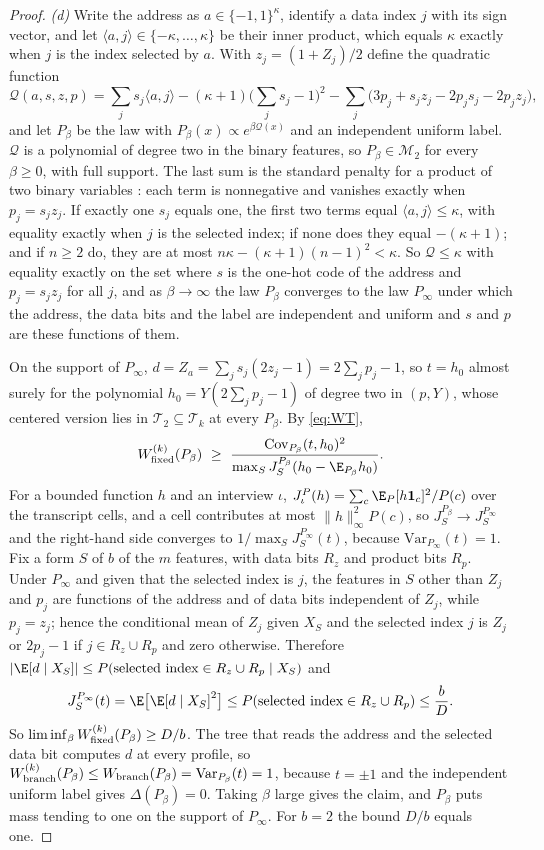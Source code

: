 \begin{proof}
\emph{(d)} Write the address as $a\in\{-1,1\}^\kappa$, identify a data index
$j$ with its sign vector, and let $\langle a,j\rangle\in\{-\kappa,\ldots,\kappa\}$
be their inner product, which equals $\kappa$ exactly when $j$ is the index
selected by $a$. With $z_j=(1+Z_j)/2$ define the quadratic function
\[
 \mathcal Q(a,s,z,p)=\sum_js_j\langle a,j\rangle-(\kappa+1)\Big(\sum_js_j-1\Big)^2
   -\sum_j\big(3p_j+s_jz_j-2p_js_j-2p_jz_j\big),
\]
and let $P_\beta$ be the law with $P_\beta(x)\propto e^{\beta\mathcal Q(x)}$ and an
independent uniform label. $\mathcal Q$ is a polynomial of degree two in the binary
features, so $P_\beta\in\mathcal M_2$ for every $\beta\ge0$, with full
support. The last sum is the standard penalty for a product of two binary
variables \citep{boros2002}: each term is nonnegative and vanishes exactly
when $p_j=s_jz_j$. If exactly one $s_j$ equals one, the first two terms equal
$\langle a,j\rangle\le\kappa$, with equality exactly when $j$ is the selected
index; if none does they equal $-(\kappa+1)$; and if $n\ge2$ do, they are at
most $n\kappa-(\kappa+1)(n-1)^2<\kappa$. So $\mathcal Q\le\kappa$ with equality
exactly on the set where $s$ is the one-hot code of the address and
$p_j=s_jz_j$ for all $j$, and as $\beta\to\infty$ the law $P_\beta$ converges
to the law $P_\infty$ under which the address, the data bits and the label
are independent and uniform and $s$ and $p$ are these functions of them.

On the support of $P_\infty$,
$d=Z_{a}=\sum_js_j(2z_j-1)=2\sum_jp_j-1$, so $t=h_0$ almost surely for the
polynomial $h_0=Y(2\sum_jp_j-1)$ of degree two in $(p,Y)$, whose centered
version lies in $\mathcal T_2\subseteq\mathcal T_k$ at every $P_\beta$. By
\eqref{eq:WT},
\[
 W^{(k)}_{\rm fixed}(P_\beta)\ \ge\ \frac{\mathrm{Cov}_{P_\beta}(t,h_0)^2}{\max_SJ^{P_\beta}_S(h_0-\E_{P_\beta}h_0)} .
\]
For a bounded function $h$ and an interview $\iota$,
$J^P_\iota(h)=\sum_c\E_P[h\mathbf 1_c]^2/P(c)$ over the transcript cells, and
a cell contributes at most $\|h\|_\infty^2P(c)$, so $J^{P_\beta}_S\to
J^{P_\infty}_S$ and the right-hand side converges to
$1/\max_SJ^{P_\infty}_S(t)$, because $\mathrm{Var}_{P_\infty}(t)=1$. Fix a
form $S$ of $b$ of the $m$ features, with data bits $R_z$ and product bits
$R_p$. Under $P_\infty$ and given that the selected index is $j$, the
features in $S$ other than $Z_j$ and $p_j$ are functions of the address and
of data bits independent of $Z_j$, while $p_j=z_j$; hence the conditional
mean of $Z_j$ given $X_S$ and the selected index $j$ is $Z_j$ or $2p_j-1$ if
$j\in R_z\cup R_p$ and zero otherwise. Therefore
$|\E[d\mid X_S]|\le P(\text{selected index}\in R_z\cup R_p\mid X_S)$ and
\[
 J^{P_\infty}_S(t)=\E\big[\E[d\mid X_S]^2\big]\le P(\text{selected index}\in R_z\cup R_p)\le\frac bD .
\]
So $\liminf_\beta W^{(k)}_{\rm fixed}(P_\beta)\ge D/b$. The tree that reads the
address and the selected data bit computes $d$ at every profile, so
$W^{(k)}_{\rm branch}(P_\beta)\le W_{\rm branch}(P_\beta)=\mathrm{Var}_{P_\beta}(t)=1$,
because $t=\pm1$ and the independent uniform label gives $\Delta(P_\beta)=0$.
Taking $\beta$ large gives the claim, and $P_\beta$ puts mass tending to one
on the support of $P_\infty$. For $b=2$ the bound $D/b$ equals one.
\end{proof}

